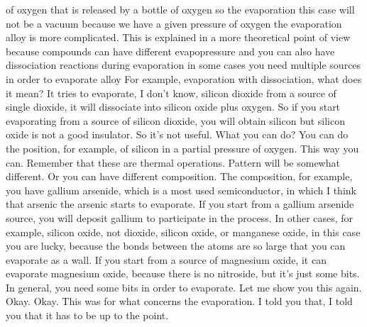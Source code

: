 of oxygen that is released by a bottle of oxygen so the evaporation this case will not be a vacuum because we have a given pressure of oxygen the evaporation alloy is more complicated.
This is explained in a more theoretical point of view because compounds can have different evapopressure and you can also have dissociation reactions during evaporation in some cases you need multiple sources in order to evaporate alloy For example, evaporation with dissociation, what does it mean? It tries to evaporate, I don't know, silicon dioxide from a source of single dioxide, it will dissociate into silicon oxide plus oxygen. So if you start evaporating from a source of silicon dioxide, you will obtain silicon but silicon oxide is not a good insulator. So it's not useful. What you can do? You can do the position, for example, of silicon in a partial pressure of oxygen. This way you can. Remember that these are thermal operations. Pattern will be somewhat different. Or you can have different composition. The composition, for example, you have gallium arsenide, which is a most used semiconductor, in which I think that arsenic the arsenic starts to evaporate. If you start from a gallium arsenide source, you will deposit gallium to participate in the process. In other cases, for example, silicon oxide, not dioxide, silicon oxide, or manganese oxide, in this case you are lucky, because the bonds between the atoms are so large that you can evaporate as a wall. If you start from a source of magnesium oxide, it can evaporate magnesium oxide, because there is no nitroside, but it's just some bits. In general, you need some bits in order to evaporate. Let me show you this again. Okay. Okay. This was for what concerns the evaporation. I told you that, I told you that it has to be up to the point.
